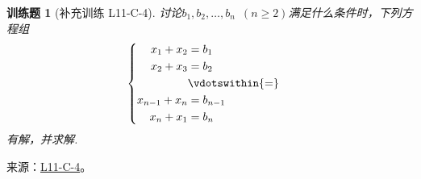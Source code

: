\documentclass[UTF8,12pt,a4paper,fontset=fandol]{ctexart}
\newtheorem{exercise}{训练题}[section]
\begin{document}
\begin{exercise}[补充训练 L11-C-4]\label{prob:L11-C-4}
讨论$b_1,b_2,\ldots,b_n\enspace(n \geqslant 2)$满足什么条件时，下列方程组
        \[\begin{cases} \begin{aligned}
                    x_1+x_2     & =b_1            \\
                    x_2+x_3     & =b_2            \\
                                & \vdotswithin{=} \\
                    x_{n-1}+x_n & =b_{n-1}        \\
                    x_n+x_1     & =b_n
                \end{aligned} \end{cases}\]有解，并求解.
\end{exercise}
\noindent 来源：\href{https://github.com/yhwu-is/Linear-Algebra-Left-Undone/blob/new/%E8%AE%B2%E4%B9%89/%E4%B8%93%E9%A2%98/11%20%E6%9C%9D%E8%8A%B1%E5%A4%95%E6%8B%BE.tex}{L11-C-4}。
\end{document}
